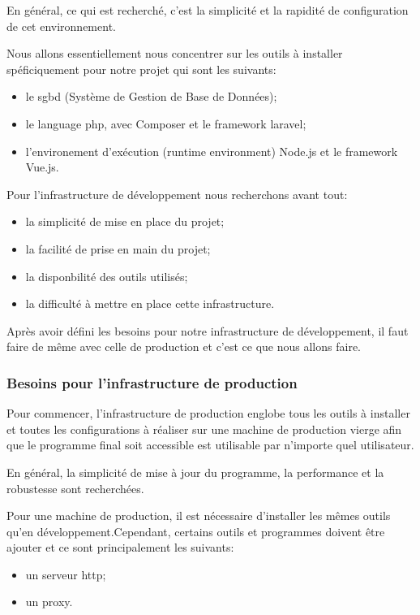 \documentclass[
    iai, %
    il, %
]{heig-tb}
\begin{document}
En général, ce qui est recherché, c'est la simplicité et la rapidité de configuration de cet environnement.

Nous allons essentiellement nous concentrer sur les outils à installer spéficiquement pour notre projet qui sont les suivants:
\begin{itemize}
    \item le \Gls{sgbd} (Système de Gestion de Base de Données);
    \item le language \Gls{php}, avec Composer et le \Gls{framework} \Gls{laravel};
    \item l'environement d'exécution (runtime environment) Node.js et le \Gls{framework} Vue.js.
\end{itemize}

Pour l'infrastructure de développement nous recherchons avant tout:
\begin{itemize}
    \item la simplicité de mise en place du projet;
    \item la facilité de prise en main du projet;
    \item la disponbilité des outils utilisés;
    \item la difficulté à mettre en place cette infrastructure.
\end{itemize}

Après avoir défini les besoins pour notre infrastructure de développement, il faut faire de même avec celle de production et c'est ce que nous allons faire.

\newpage

\subsubsection{Besoins pour l'infrastructure de production}
Pour commencer, l'infrastructure de production englobe tous les outils à installer et toutes les configurations à réaliser sur une machine de production vierge afin que le programme final soit accessible est utilisable par n'importe quel utilisateur.

En général, la simplicité de mise à jour du programme, la performance et la robustesse sont recherchées.

Pour une machine de production, il est nécessaire d'installer les mêmes outils qu'en développement.Cependant, certains outils et programmes doivent être ajouter et ce sont principalement les suivants:
\begin{itemize}
    \item un serveur \Gls{http};
    \item un \Gls{proxy}.
\end{itemize}
\end{document}
